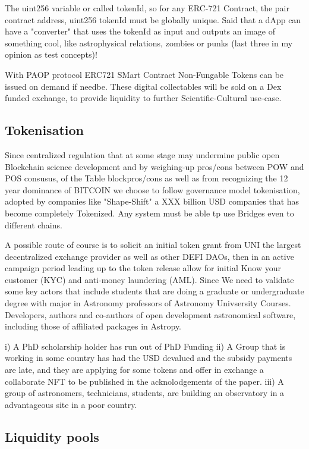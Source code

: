 \documentclass[final,5p,times,twocolumn,authoryear]{elsarticle}
\begin{document}
The uint256 variable or called tokenId, so for any ERC-721 Contract, the pair contract address, uint256 tokenId must be globally unique. Said that a dApp can have a "converter" that uses the tokenId as input and outputs an image of something cool, like astrophysical relations,  zombies or punks (last three in my opinion as test concepts)!


With PAOP protocol ERC721 SMart Contract Non-Fungable Tokens can be issued on demand if needbe. These digital collectables will be sold on a Dex funded exchange, to provide liquidity to further Scientific-Cultural use-case.



\subsection{Tokenisation}

Since centralized regulation that at some stage may undermine public open Blockchain science development and by weighing-up pros/cons between POW and POS consusus, of the Table blockpros/cons as well as from recognizing the 12 year dominance of BITCOIN we choose to follow governance model tokenisation, adopted by  companies like "Shape-Shift" a XXX billion USD companies that has become completely Tokenized. Any system must be able tp use Bridges even to different chains. 

A possible route of course is to solicit an initial token grant from UNI the largest decentralized exchange provider as well as other DEFI DAOs, then in an active campaign period leading up to the token release allow for initial Know your customer (KYC) and anti-money laundering (AML). Since We need to validate some key actors that include students that are doing a graduate or undergraduate degree with major in Astronomy professors of Astronomy Univsersity Courses. Developers, authors and co-authors of open development astronomical software, including those of affiliated packages in Astropy. 

i) A PhD scholarship holder has run out of PhD Funding 
ii) A Group that is working in some country has had the USD devalued and the subsidy payments are late, and they are applying for some tokens and offer in exchange a collaborate NFT to be published in the acknolodgements of the paper.
iii) A group of astronomers, technicians, students,  are building an observatory in a advantageous site in a poor country. 

\subsection{Liquidity pools}
\end{document}
